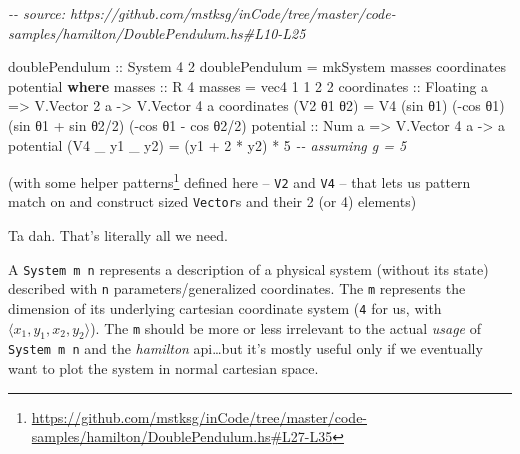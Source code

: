 \documentclass[]{article}
\newenvironment{Shaded}{}{}
\newcommand{\CommentTok}[1]{\textcolor[rgb]{0.38,0.63,0.69}{\textit{#1}}}
\newcommand{\DataTypeTok}[1]{\textcolor[rgb]{0.56,0.13,0.00}{#1}}
\newcommand{\DecValTok}[1]{\textcolor[rgb]{0.25,0.63,0.44}{#1}}
\newcommand{\FunctionTok}[1]{\textcolor[rgb]{0.02,0.16,0.49}{#1}}
\newcommand{\KeywordTok}[1]{\textcolor[rgb]{0.00,0.44,0.13}{\textbf{#1}}}
\newcommand{\NormalTok}[1]{#1}
\newcommand{\OperatorTok}[1]{\textcolor[rgb]{0.40,0.40,0.40}{#1}}
\newcommand{\OtherTok}[1]{\textcolor[rgb]{0.00,0.44,0.13}{#1}}
\renewcommand{\href}[2]{#2\footnote{\url{#1}}}
\begin{document}
\begin{Shaded}
\begin{Highlighting}[]
\CommentTok{{-}{-} source: https://github.com/mstksg/inCode/tree/master/code{-}samples/hamilton/DoublePendulum.hs\#L10{-}L25}

\OtherTok{doublePendulum ::} \DataTypeTok{System} \DecValTok{4} \DecValTok{2}
\NormalTok{doublePendulum }\OtherTok{=}\NormalTok{ mkSystem\textquotesingle{} masses coordinates potential}
  \KeywordTok{where}
\OtherTok{    masses ::} \DataTypeTok{R} \DecValTok{4}
\NormalTok{    masses }\OtherTok{=}\NormalTok{ vec4 }\DecValTok{1} \DecValTok{1} \DecValTok{2} \DecValTok{2}
\NormalTok{    coordinates}
\OtherTok{        ::} \DataTypeTok{Floating}\NormalTok{ a}
        \OtherTok{=\textgreater{}} \DataTypeTok{V.Vector} \DecValTok{2}\NormalTok{ a}
        \OtherTok{{-}\textgreater{}} \DataTypeTok{V.Vector} \DecValTok{4}\NormalTok{ a}
\NormalTok{    coordinates (}\DataTypeTok{V2}\NormalTok{ θ1 θ2) }\OtherTok{=} \DataTypeTok{V4}\NormalTok{ (}\FunctionTok{sin}\NormalTok{ θ1)            (}\OperatorTok{{-}}\FunctionTok{cos}\NormalTok{ θ1)}
\NormalTok{                                (}\FunctionTok{sin}\NormalTok{ θ1 }\OperatorTok{+} \FunctionTok{sin}\NormalTok{ θ2}\OperatorTok{/}\DecValTok{2}\NormalTok{) (}\OperatorTok{{-}}\FunctionTok{cos}\NormalTok{ θ1 }\OperatorTok{{-}} \FunctionTok{cos}\NormalTok{ θ2}\OperatorTok{/}\DecValTok{2}\NormalTok{)}
\NormalTok{    potential}
\OtherTok{        ::} \DataTypeTok{Num}\NormalTok{ a}
        \OtherTok{=\textgreater{}} \DataTypeTok{V.Vector} \DecValTok{4}\NormalTok{ a}
        \OtherTok{{-}\textgreater{}}\NormalTok{ a}
\NormalTok{    potential (}\DataTypeTok{V4}\NormalTok{ \_ y1 \_ y2) }\OtherTok{=}\NormalTok{ (y1 }\OperatorTok{+} \DecValTok{2} \OperatorTok{*}\NormalTok{ y2) }\OperatorTok{*} \DecValTok{5}    \CommentTok{{-}{-} assuming g = 5}
\end{Highlighting}
\end{Shaded}

(with some
\href{https://github.com/mstksg/inCode/tree/master/code-samples/hamilton/DoublePendulum.hs\#L27-L35}{helper
patterns} defined here -- \texttt{V2} and \texttt{V4} -- that lets us pattern
match on and construct sized \texttt{Vector}s and their 2 (or 4) elements)

Ta dah. That's literally all we need.

A \texttt{System\ m\ n} represents a description of a physical system (without
its state) described with \texttt{n} parameters/generalized coordinates. The
\texttt{m} represents the dimension of its underlying cartesian coordinate
system (\texttt{4} for us, with \(\langle x_1, y_1, x_2, y_2 \rangle\)). The
\texttt{m} should be more or less irrelevant to the actual \emph{usage} of
\texttt{System\ m\ n} and the \emph{hamilton} api\ldots but it's mostly useful
only if we eventually want to plot the system in normal cartesian space.
\end{document}

